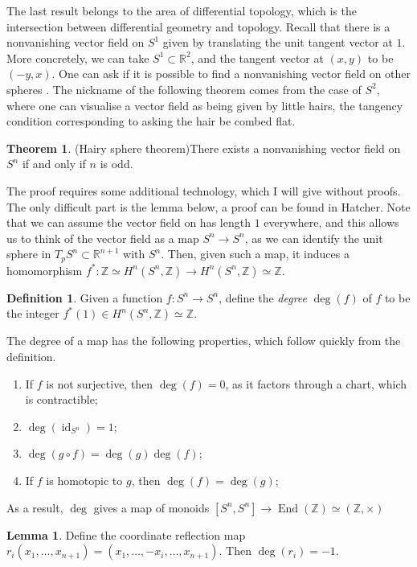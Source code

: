 \documentclass{tufte-handout}
\def\RR{\mathbb{R}}
\def\ZZ{\mathbb{Z}}
\DeclareMathOperator{\End}{End}
\DeclareMathOperator{\id}{id}
\DeclareMathOperator{\Deg}{deg}
\theoremstyle{definition}
\newtheorem{lemma}{Lemma}
\newtheorem{definition}{Definition}
\newtheorem{theorem}{Theorem}
\begin{document}
The last result belongs to the area of differential topology, which is the intersection between differential geometry and topology. Recall that there is a nonvanishing vector field on $S^1$ given by translating the unit tangent vector at $1$. More concretely, we can take $S^1 \subset \RR^2$, and the tangent vector at $(x,y)$ to be $(-y,x)$. One can ask if it is possible to find a nonvanishing vector field on other spheres . The nickname of the following theorem comes from the case of $S^2$, where one can visualise a vector field as being given by little hairs, the tangency condition corresponding to asking the hair be combed flat. 

\begin{theorem}{(Hairy sphere theorem)}\label{thm:hairy_sphere}
There exists a nonvanishing vector field on $S^n$ if and only if $n$ is odd.
\end{theorem}

The proof requires some additional technology, which I will give without proofs. The only difficult part is the lemma below, a proof can be found in Hatcher.
Note that we can assume the vector field on has length $1$ everywhere, and this allows us to think of the vector field as a map $S^n \to S^n$, as we can identify the unit sphere in $T_pS^n \subset \RR^{n+1}$ with $S^n$. Then, given such a map, it induces a homomorphism $f^*\colon \ZZ \simeq H^n(S^n,\ZZ) \to H^n(S^n,\ZZ) \simeq \ZZ$.

\begin{definition}
Given a function $f\colon S^n \to S^n$, define the \emph{degree} $\Deg(f)$ of $f$ to be the integer $f^*(1)\in H^n(S^n,\ZZ) \simeq \ZZ$.
\end{definition}

The degree of a map has the following properties, which follow quickly from the definition.
\begin{enumerate}
\item If $f$ is not surjective, then $\Deg(f)=0$, as it factors through a chart, which is contractible;
\item $\Deg(\id_{S^n})=1$;
\item $\Deg(g\circ f) = \Deg(g)\Deg(f)$;
\item If $f$ is homotopic to $g$, then $\Deg(f) = \Deg(g)$;
\end{enumerate}
As a result, $\Deg$ gives a map of monoids $[S^n,S^n] \to \End(\ZZ)\simeq (\ZZ,\times)$

\begin{lemma}
Define the coordinate reflection map $r_i(x_1,\ldots,x_{n+1}) = (x_1,\ldots,-x_i,\ldots,x_{n+1})$. Then $\Deg(r_i) = -1$.
\end{lemma}
\end{document}
